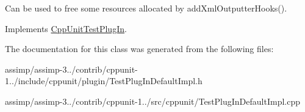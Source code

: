 Can be used to free some resources allocated by add\+Xml\+Outputter\+Hooks(). 

Implements \hyperlink{struct_cpp_unit_test_plug_in_a045727ad9658525838b0b9157065fbcd}{Cpp\+Unit\+Test\+Plug\+In}.



The documentation for this class was generated from the following files\+:\begin{DoxyCompactItemize}
\item 
assimp/assimp-\/3../contrib/cppunit-\/1../include/cppunit/plugin/Test\+Plug\+In\+Default\+Impl.\+h\item 
assimp/assimp-\/3../contrib/cppunit-\/1../src/cppunit/Test\+Plug\+In\+Default\+Impl.\+cpp\end{DoxyCompactItemize}
